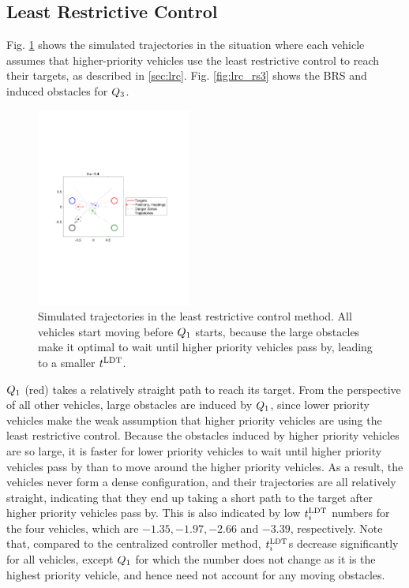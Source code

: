 \subsection{Least Restrictive Control}
Fig. \ref{fig:lrc_traj} shows the simulated trajectories in the situation where each vehicle assumes that higher-priority vehicles use the least restrictive control to reach their targets, as described in \ref{sec:lrc}. Fig. \ref{fig:lrc_rs3} shows the BRS and induced obstacles for $Q_3$.

\begin{figure}
  \centering
  \includegraphics[width=0.45\textwidth]{"fig/lrc_traj"}
  \caption{Simulated trajectories in the least restrictive control method. All vehicles start moving before $Q_1$ starts, because the large obstacles make it optimal to wait until higher priority vehicles pass by, leading to a smaller $t^\text{LDT}$. }
  \label{fig:lrc_traj}
\end{figure}

$Q_1$ (red) takes a relatively straight path to reach its target. From the perspective of all other vehicles, large obstacles are induced by $Q_1$, since lower priority vehicles make the weak assumption that higher priority vehicles are using the least restrictive control. Because the obstacles induced by higher priority vehicles are so large, it is faster for lower priority vehicles to wait until higher priority vehicles pass by than to move around the higher priority vehicles. As a result, the vehicles never form a dense configuration, and their trajectories are all relatively straight, indicating that they end up taking a short path to the target after higher priority vehicles pass by. This is also indicated by low $t^\text{LDT}_i$ numbers for the four vehicles, which are $-1.35, -1.97, -2.66$ and $-3.39$, respectively. Note that, compared to the centralized controller method, $t^\text{LDT}_i$s decrease significantly for all vehicles, except $Q_1$ for which the number does not change as it is the highest priority vehicle, and hence need not account for any moving obstacles. 

